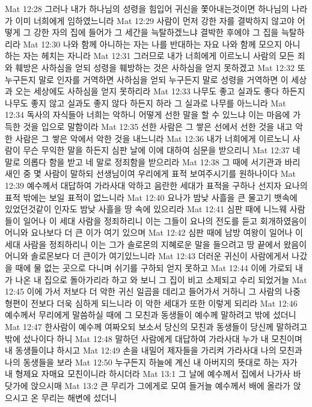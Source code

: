 Mat 12:28  그러나 내가 하나님의 성령을 힘입어 귀신을 쫓아내는것이면 하나님의 나라가 이미 너희에게 임하였느니라
Mat 12:29  사람이 먼저 강한 자를 결박하지 않고야 어떻게 그 강한 자의 집에 들어가 그 세간을 늑탈하겠느냐 결박한 후에야 그 집을 늑탈하리라
Mat 12:30  나와 함께 아니하는 자는 나를 반대하는 자요 나와 함께 모으지 아니하는 자는 헤치는 자니라
Mat 12:31  그러므로 내가 너희에게 이르노니 사람의 모든 죄와 훼방은 사하심을 얻되 성령을 훼방하는 것은 사하심을 얻지 못하겠고
Mat 12:32  또 누구든지 말로 인자를 거역하면 사하심을 얻되 누구든지 말로 성령을 거역하면 이 세상과 오는 세상에도 사하심을 얻지 못하리라
Mat 12:33  나무도 좋고 실과도 좋다 하든지 나무도 좋지 않고 실과도 좋지 않다 하든지 하라 그 실과로 나무를 아느니라
Mat 12:34  독사의 자식들아 너희는 악하니 어떻게 선한 말을 할 수 있느냐 이는 마음에 가득한 것을 입으로 말함이라
Mat 12:35  선한 사람은 그 쌓은 선에서 선한 것을 내고 악한 사람은 그 쌓은 악에서 악한 것을 내느니라
Mat 12:36  내가 너희에게 이르노니 사람이 무슨 무익한 말을 하든지 심판 날에 이에 대하여 심문을 받으리니
Mat 12:37  네 말로 의롭다 함을 받고 네 말로 정죄함을 받으리라
Mat 12:38  그 때에 서기관과 바리새인 중 몇 사람이 말하되 선생님이여 우리에게 표적 보여주시기를 원하나이다
Mat 12:39  예수께서 대답하여 가라사대 악하고 음란한 세대가 표적을 구하나 선지자 요나의 표적 밖에는 보일 표적이 없느니라
Mat 12:40  요나가 밤낮 사흘을 큰 물고기 뱃속에 있었던것같이 인자도 밤낮 사흘을 땅 속에 있으리라
Mat 12:41  심판 때에 니느웨 사람들이 일어나 이 세대 사람을 정죄하리니 이는 그들이 요나의 전도를 듣고 회개하였음이어니와 요나보다 더 큰 이가 여기 있으며
Mat 12:42  심판 때에 남방 여왕이 일어나 이 세대 사람을 정죄하리니 이는 그가 솔로몬의 지혜로운 말을 들으려고 땅 끝에서 왔음이어니와 솔로몬보다 더 큰이가 여기있느니라
Mat 12:43  더러운 귀신이 사람에게서 나갔을 때에 물 없는 곳으로 다니며 쉬기를 구하되 얻지 못하고
Mat 12:44  이에 가로되 내가 나온 내 집으로 돌아가리라 하고 와 보니 그 집이 비고 소제되고 수리 되었거늘
Mat 12:45  이에 가서 저보다 더 악한 귀신 일곱을 데리고 들어가서 거하니 그 사람의 나중 형편이 전보다 더욱 심하게 되느니라 이 악한 세대가 또한 이렇게 되리라
Mat 12:46  예수께서 무리에게 말씀하실 때에 그 모친과 동생들이 예수께 말하려고 밖에 섰더니
Mat 12:47  한사람이 예수께 여짜오되 보소서 당신의 모친과 동생들이 당신께 말하려고 밖에 섰나이다 하니
Mat 12:48  말하던 사람에게 대답하여 가라사대 누가 내 모친이며 내 동생들이냐 하시고
Mat 12:49  손을 내밀어 제자들을 가리켜 가라사대 나의 모친과 나의 동생들을 보라
Mat 12:50  누구든지 하늘에 계신 내 아버지의 뜻대로 하는 자가 내 형제요 자매요 모친이니라 하시더라
Mat 13:1  그 날에 예수께서 집에서 나가사 바닷가에 앉으시매
Mat 13:2  큰 무리가 그에게로 모여 들거늘 예수께서 배에 올라가 앉으시고 온 무리는 해변에 섰더니
